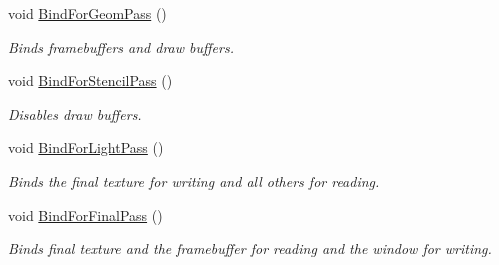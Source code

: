 \begin{DoxyCompactItemize}
\mbox{\label{class_geometry_engine_1_1_geometry_buffer_1_1_g_buffer_ae64ee0860824a077b2fab97440a0bb9e}} 
void \mbox{\hyperlink{class_geometry_engine_1_1_geometry_buffer_1_1_g_buffer_ae64ee0860824a077b2fab97440a0bb9e}{Bind\+For\+Geom\+Pass}} ()
\begin{DoxyCompactList}\small\item\em Binds framebuffers and draw buffers. \end{DoxyCompactList}\item 
\mbox{\label{class_geometry_engine_1_1_geometry_buffer_1_1_g_buffer_ad95cdd645bd506eac9b2dfb1dee3fa7e}} 
void \mbox{\hyperlink{class_geometry_engine_1_1_geometry_buffer_1_1_g_buffer_ad95cdd645bd506eac9b2dfb1dee3fa7e}{Bind\+For\+Stencil\+Pass}} ()
\begin{DoxyCompactList}\small\item\em Disables draw buffers. \end{DoxyCompactList}\item 
\mbox{\label{class_geometry_engine_1_1_geometry_buffer_1_1_g_buffer_ac5949998af55b92bdb753e055c49f26d}} 
void \mbox{\hyperlink{class_geometry_engine_1_1_geometry_buffer_1_1_g_buffer_ac5949998af55b92bdb753e055c49f26d}{Bind\+For\+Light\+Pass}} ()
\begin{DoxyCompactList}\small\item\em Binds the final texture for writing and all others for reading. \end{DoxyCompactList}\item 
\mbox{\label{class_geometry_engine_1_1_geometry_buffer_1_1_g_buffer_ae35be249f45427e6425dfdaf2c67e61c}} 
void \mbox{\hyperlink{class_geometry_engine_1_1_geometry_buffer_1_1_g_buffer_ae35be249f45427e6425dfdaf2c67e61c}{Bind\+For\+Final\+Pass}} ()
\begin{DoxyCompactList}\small\item\em Binds final texture and the framebuffer for reading and the window for writing. \end{DoxyCompactList}\item 
\mbox{\label{class_geometry_engine_1_1_geometry_buffer_1_1_g_buffer_a9c67280eb1c468c049674662bc81af5b}} 

\end{DoxyCompactItemize}
